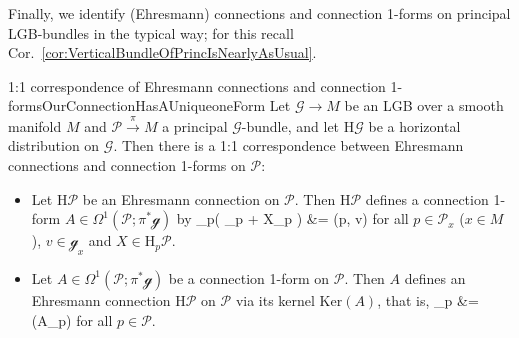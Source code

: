 \documentclass[a4paper,oneside,11pt,bibliography=totoc]{scrartcl}
\def\bas#1\eas{\begin{align*}#1\end{align*}}
\theoremstyle{plain}
\theoremstyle{remark}
\theoremstyle{definition}
\begin{document}
Finally, we identify (Ehresmann) connections and connection 1-forms on principal LGB-bundles in the typical way; for this recall Cor.\ \ref{cor:VerticalBundleOfPrincIsNearlyAsUsual}.

\begin{theorems}{1:1 correspondence of Ehresmann connections and connection 1-forms}{OurConnectionHasAUniqueoneForm}
Let $\mathcal{G} \to M$ be an LGB over a smooth manifold $M$ and $\mathcal{P} \stackrel{\pi}{\to} M$ a principal $\mathcal{G}$-bundle, and let $\mathrm{H}\mathcal{G}$ be a horizontal distribution on $\mathcal{G}$. Then there is a 1:1 correspondence between Ehresmann connections and connection 1-forms on $\mathcal{P}$:
\begin{itemize}
	\item Let $\mathrm{H}\mathcal{P}$ be an Ehresmann connection on $\mathcal{P}$. Then $\mathrm{H}\mathcal{P}$ defines a connection 1-form $A \in \Omega^1(\mathcal{P}; \pi^*\mathcal{g})$ by
	\bas
	A_p\bigl( _p + X_p \bigr)
	&=
	(p, v)
	\eas
	for all $p \in \mathcal{P}_x$ ($x \in M$), $v \in \mathcal{g}_x$ and $X \in \mathrm{H}_p\mathcal{P}$.
	\item Let $A \in \Omega^1(\mathcal{P}; \pi^*\mathcal{g})$ be a connection 1-form on $\mathcal{P}$. Then $A$ defines an Ehresmann connection $\mathrm{H}\mathcal{P}$ on $\mathcal{P}$ via its kernel $\mathrm{Ker}(A)$, that is,
	\bas
	\mathrm{H}_p\mathcal{P}
	&=
	(A_p)
	\eas
	for all $p \in {}$.
\end{itemize}
\end{theorems}
\end{document}
